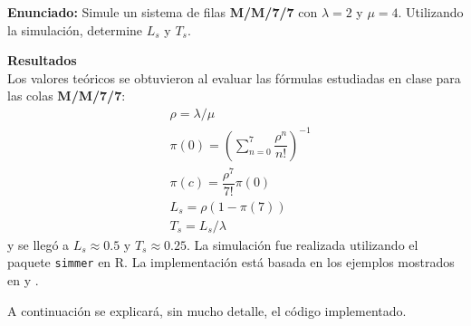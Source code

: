 \maketitle
\textbf{Enunciado: } Simule un sistema de filas \textbf{M/M/7/7} con $\lambda=2$ y $\mu=4$. Utilizando la simulación, determine $L_s$ y $T_s$.\vspace{1cm}

\textbf{Resultados\\}
Los valores teóricos se obtuvieron al evaluar las fórmulas estudiadas en clase para las colas \textbf{M/M/7/7}:
\begin{equation}\label{eq:teo}
    \begin{split}
        &\rho = \lambda/\mu\\
        &\pi(0) = \left(\sum_{n=0}^7\dfrac{\rho^n}{n!}\right)^{-1}\\
        &\pi(c)=\dfrac{\rho^7}{7!}\pi(0)\\
        &L_s=\rho(1-\pi(7))\\
        &T_s=L_s/\lambda
    \end{split}
\end{equation}
y se llegó a $L_s\approx0.5$ y $T_s\approx0.25$.
La simulación fue realizada utilizando el paquete \texttt{simmer} \cite{simmer} en R. La implementación está basada en los ejemplos mostrados en \cite{ex_simmer} y \cite{ex_simmer2}.

A continuación se explicará, sin mucho detalle, el código implementado.

